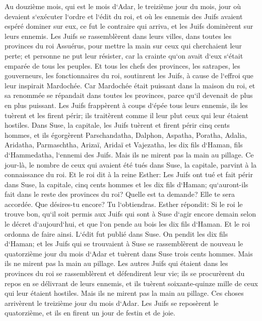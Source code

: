 \verse Au douzième mois, qui est le mois d`Adar, le treizième jour du mois, jour où devaient s`exécuter l`ordre et l`édit du roi, et où les ennemis des Juifs avaient espéré dominer sur eux, ce fut le contraire qui arriva, et les Juifs dominèrent sur leurs ennemis. 
\verse Les Juifs se rassemblèrent dans leurs villes, dans toutes les provinces du roi Assuérus, pour mettre la main sur ceux qui cherchaient leur perte; et personne ne put leur résister, car la crainte qu`on avait d`eux s`était emparée de tous les peuples. 
\verse Et tous les chefs des provinces, les satrapes, les gouverneurs, les fonctionnaires du roi, soutinrent les Juifs, à cause de l`effroi que leur inspirait Mardochée. 
\verse Car Mardochée était puissant dans la maison du roi, et sa renommée se répandait dans toutes les provinces, parce qu`il devenait de plus en plus puissant. 
\verse Les Juifs frappèrent à coups d`épée tous leurs ennemis, ils les tuèrent et les firent périr; ils traitèrent comme il leur plut ceux qui leur étaient hostiles. 
\verse Dans Suse, la capitale, les Juifs tuèrent et firent périr cinq cents hommes, 
\verse et ils égorgèrent Parschandatha, Dalphon, Aspatha, 
\verse Poratha, Adalia, Aridatha, 
\verse Parmaschtha, Arizaï, Aridaï et Vajezatha, 
\verse les dix fils d`Haman, fils d`Hammedatha, l`ennemi des Juifs. Mais ils ne mirent pas la main au pillage. 
\verse Ce jour-là, le nombre de ceux qui avaient été tués dans Suse, la capitale, parvint à la connaissance du roi. 
\verse Et le roi dit à la reine Esther: Les Juifs ont tué et fait périr dans Suse, la capitale, cinq cents hommes et les dix fils d`Haman; qu`auront-ils fait dans le reste des provinces du roi? Quelle est ta demande? Elle te sera accordée. Que désires-tu encore? Tu l`obtiendras. 
\verse Esther répondit: Si le roi le trouve bon, qu`il soit permis aux Juifs qui sont à Suse d`agir encore demain selon le décret d`aujourd`hui, et que l`on pende au bois les dix fils d`Haman. 
\verse Et le roi ordonna de faire ainsi. L`édit fut publié dans Suse. On pendit les dix fils d`Haman; 
\verse et les Juifs qui se trouvaient à Suse se rassemblèrent de nouveau le quatorzième jour du mois d`Adar et tuèrent dans Suse trois cents hommes. Mais ils ne mirent pas la main au pillage. 
\verse Les autres Juifs qui étaient dans les provinces du roi se rassemblèrent et défendirent leur vie; ils se procurèrent du repos en se délivrant de leurs ennemis, et ils tuèrent soixante-quinze mille de ceux qui leur étaient hostiles. Mais ils ne mirent pas la main au pillage. 
\verse Ces choses arrivèrent le treizième jour du mois d`Adar. Les Juifs se reposèrent le quatorzième, et ils en firent un jour de festin et de joie. 
